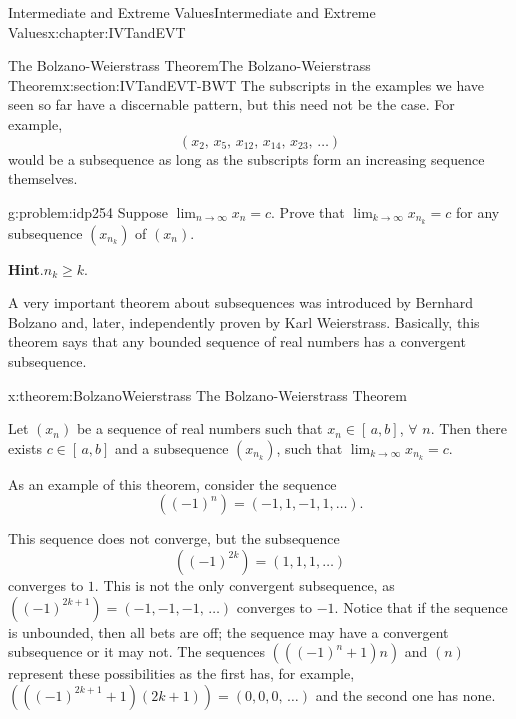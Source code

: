 \begin{chapterptx}{Intermediate and Extreme Values}{}{Intermediate and Extreme Values}{}{}{x:chapter:IVTandEVT}
\begin{sectionptx}{The Bolzano-Weierstrass Theorem}{}{The Bolzano-Weierstrass Theorem}{}{}{x:section:IVTandEVT-BWT}
		The subscripts in the examples we have seen so far have a discernable pattern, but this need not be the case. For example,%
		\begin{equation*}
			\left(x_2,\,x_5,\,x_{12},\,x_{14},\,x_{23},\,\ldots\right)
		\end{equation*}
		would be a subsequence as long as the subscripts form an increasing sequence themselves.%
		\begin{problem}{}{g:problem:idp254}%
			 Suppose \(\lim_{n\rightarrow\infty}x_n=c\). Prove that \(\lim_{k\rightarrow\infty}x_{n_k}=c\) for any subsequence \(\left(x_{n_k}\right)\) of \(\left(x_n\right)\).%
			\par\smallskip%
			\noindent\textbf{\blocktitlefont Hint}.\hypertarget{g:hint:idp255}{}\quad{}\(n_k\geq k\).%
		\end{problem}
		A very important theorem about subsequences was introduced by Bernhard Bolzano  and, later, independently proven  by Karl Weierstrass. Basically, this theorem says that any bounded sequence of real numbers has a convergent subsequence.%
		\begin{theorem}{}{}{x:theorem:BolzanoWeierstrass}%
			\alert{The Bolzano-Weierstrass Theorem}%
			\par
			 Let \(\left(x_n\right)\) be a sequence of real numbers such that \(x_n\in[\,a,b]\), \(\forall\) \(n\).  Then there exists \(c\in[\,a,b]\) and a subsequence \(\left(x_{n_k}\right)\), such that \(\lim_{k\rightarrow\infty}x_{n_k}=c\).%
		\end{theorem}
		As an example of this theorem, consider the sequence%
		\begin{equation*}
			\left((-1)^n\right)=\left(-1,1,-1,1,\ldots\right) \text{.}
		\end{equation*}
		\par
		This sequence does not converge, but the subsequence%
		\begin{equation*}
			\left((-1)^{2k}\right)=\left(1,1,1,\ldots\right)
		\end{equation*}
		converges to \(1\). This is not the only convergent subsequence, as \(\left((-1)^{2k+1}\right)=(-1,-1,-1,\,\ldots)\) converges to \(-1\). Notice that if the sequence is unbounded, then all bets are off; the sequence may have a convergent subsequence or it may not. The sequences \(\left(\left((-1)^n+1\right)n\right)\) and \(\left(n\right)\) represent these possibilities as the first has, for example, \(\left(\left((-1)^{2k+1}+1\right)(2k+1)\right)=(0,0,0,\,\ldots)\) and the second one has none.%

\end{sectionptx}
\end{chapterptx}
